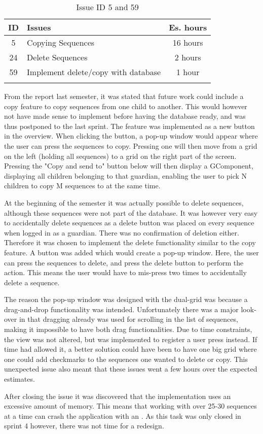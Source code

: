 \begin{longtable} { | c | p{12cm} | c | } 
\hline
	ID 	&	Issues	&		 Es. hours \\\hline
	5	&	Copying Sequences	&	16 hours	\\\hline
	24	& 	Delete Sequences	&	2 hours \\\hline
	59  	&	Implement delete/copy with database	&	1 hour \\\hline
\caption{Issue ID 5 and 59}
\label{tab:spr4_copyingsequences}
\end{longtable}

From the report last semester, it was stated that future work could include a copy feature to copy sequences from one child to another. This would however not have made sense to implement before having the database ready, and was thus postponed to the last sprint. The feature was implemented as a new button in the overview. When clicking the button, a pop-up window would appear where the user can press the sequences to copy. Pressing one will then move from a grid on the left (holding all sequences) to a grid on the right part of the screen. Pressing the "Copy and send to" button below will then display a GComponent, displaying all children belonging to that guardian, enabling the user to pick N children to copy M sequences to at the same time. 

At the beginning of the semester it was actually possible to delete sequences, although these sequences were not part of the database. It was however very easy to accidentally delete sequences as a delete button was placed on every sequence when logged in as a guardian. There was no confirmation of deletion either.  Therefore it was chosen to implement the delete functionality similar to the copy feature. A button was added which would create a pop-up window. Here, the user can press the sequences to delete, and press the delete button to perform the action. This means the user would have to mis-press two times to accidentally delete a sequence.

The reason the pop-up window was designed with the dual-grid was because a drag-and-drop functionality was intended. Unfortunately there was a major look-over in that dragging already was used for scrolling in the list of sequences, making it impossible to have both drag functionalities. Due to time constraints, the view was not altered, but was implemented to register a user press instead. If time had allowed it, a better solution could have been to have one big grid where one could add checkmarks to the sequences one wanted to delete or copy. This unexpected issue also meant that these issues went a few hours over the expected estimates.

After closing the issue it was discovered that the implementation uses an excessive amount of memory. This means that working with over 25-30 sequences at a time can crash the application with an . As this task was only closed in sprint 4 however, there was not time for a redesign.